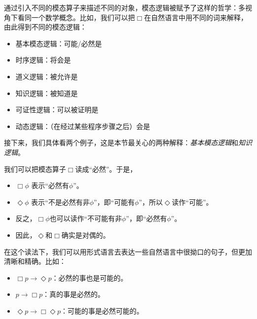 通过引入不同的模态算子来描述不同的对象，模态逻辑被赋予了这样的哲学：多视角下看同一个数学概念。比如，我们可以把$\Box$在自然语言中用不同的词来解释，由此得到不同的模态逻辑：
\begin{itemize}
    \item 基本模态逻辑：可能/必然是
    \item 时序逻辑：将会是
    \item 道义逻辑：被允许是
    \item 知识逻辑：被知道是
    \item 可证性逻辑：可以被证明是
    \item 动态逻辑：（在经过某些程序步骤之后）会是
\end{itemize}

接下来，我们具体看两个例子，这是本节最关心的两种解释：\emph{基本模态逻辑}和\emph{知识逻辑}。
\begin{example}[基本模态逻辑]
我们可以把模态算子$\Box$读成“必然”。于是，
\begin{itemize}
    \item $\Box\phi$ 表示“必然有$\phi$”。
    \item $\Diamond\phi$ 表示“不是必然有非$\phi$”，即“可能有$\phi$”，所以$\Diamond$读作“可能”。
    \item 反之，$\Box\phi$也可以读作“不可能有非$\phi$”，即“必然有$\phi$”。
    \item 因此，$\Diamond$和$\Box$确实是对偶的。
\end{itemize}

在这个读法下，我们可以用形式语言去表达一些自然语言中很拗口的句子，但更加清晰和精确。比如：
\begin{itemize}
    \item $\Box p\to\Diamond p$：必然的事也是可能的。
    \item $p\to\Box p$：真的事是必然的。
    \item $\Diamond p\to\Box\Diamond p$：可能的事是必然可能的。
\end{itemize}
\end{example}

